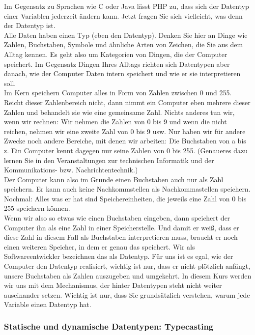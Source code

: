 Im Gegensatz zu Sprachen wie C oder Java lässt PHP zu, dass sich der Datentyp einer Variablen jederzeit ändern kann. Jetzt fragen Sie sich vielleicht, was denn der Datentyp ist.\\

Alle Daten haben einen Typ (eben den Datentyp). Denken Sie hier an Dinge wie Zahlen, Buchstaben, Symbole und ähnliche Arten von Zeichen, die Sie aus dem Alltag kennen. Es geht also um Kategorien von Dingen, die der Computer speichert. Im Gegensatz Dingen Ihres Alltags richten sich Datentypen aber danach, wie der Computer Daten intern speichert und wie er sie interpretieren soll.\\


Im Kern speichern Computer alles in Form von Zahlen zwischen 0 und 255. Reicht dieser Zahlenbereich nicht, dann nimmt ein Computer eben mehrere dieser Zahlen und behandelt sie wie eine gemeinsame Zahl. Nichts anderes tun wir, wenn wir rechnen: Wir nehmen die Zahlen von 0 bis 9 und wenn die nicht reichen, nehmen wir eine zweite Zahl von 0 bis 9 usw. Nur haben wir für andere Zwecke noch andere Bereiche, mit denen wir arbeiten: Die Buchstaben von a bis z. Ein Computer kennt dagegen nur seine Zahlen von 0 bis 255. (Genaueres dazu lernen Sie in den Veranstaltungen zur technischen Informatik und der Kommunikations- bzw. Nachrichtentechnik.)\\

Der Computer kann also im Grunde einen Buchstaben auch nur als Zahl speichern. Er kann auch keine Nachkommstellen als Nachkommastellen speichern. Nochmal: Alles was er hat sind Speichereinheiten, die jeweils eine Zahl von 0 bis 255 speichern können.\\


Wenn wir also so etwas wie einen Buchstaben eingeben, dann speichert der Computer ihn als eine Zahl in einer Speicherstelle. Und damit er weiß, dass er diese Zahl in diesem Fall als Buchstaben interpretieren muss, braucht er noch einen weiteren Speicher, in dem er genau das speichert. Wir als Softwareentwickler bezeichnen das als Datentyp. Für uns ist es egal, wie der Computer den Datentyp realisiert, wichtig ist nur, dass er nicht plötzlich anfängt, unsere Buchstaben als Zahlen auszugeben und umgekehrt. In diesem Kurs werden wir uns mit dem Mechanismus, der hinter Datentypen steht nicht weiter auseinander setzen. Wichtig ist nur, dass Sie grundsätzlich verstehen, warum jede Variable einen Datentyp hat.

\subsubsection{Statische und dynamische Datentypen: Typecasting}

